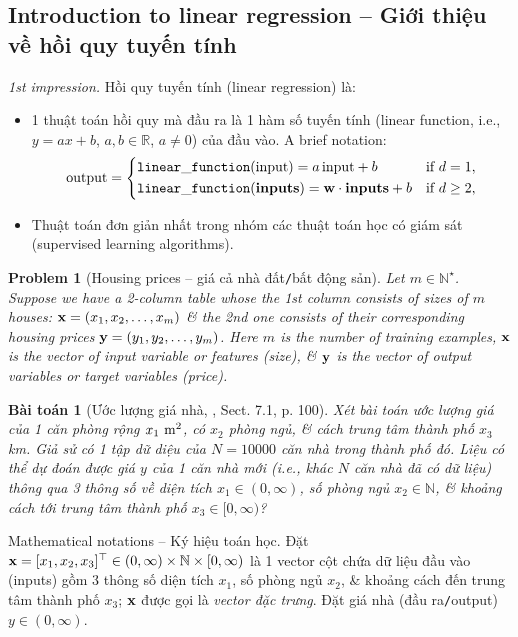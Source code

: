 \documentclass{article}
\newtheorem{baitoan}{Bài toán}
\newtheorem{problem}{Problem}
\begin{document}
\subsection{Introduction to linear regression -- Giới thiệu về hồi quy tuyến tính}
{\it1st impression.} Hồi quy tuyến tính (linear regression) là:
\begin{itemize}
	\item 1 thuật toán hồi quy mà đầu ra là 1 hàm số tuyến tính (linear function, i.e., $y = ax + b$, $a,b\in\mathbb{R}$, $a\ne0$) của đầu vào. A brief notation:
	\begin{equation*}
		{\rm output} = \left\{\begin{split}
			&{\tt linear\_function}({\rm input}) = a\,{\rm input} + b&&\mbox{if } d = 1,\\
			&{\tt linear\_function}({\bf inputs}) = {\bf w}\cdot{\bf inputs} + b&&\mbox{if } d\ge2,\\
		\end{split}\right.
	\end{equation*}
	\item Thuật toán đơn giản nhất trong nhóm các thuật toán học có giám sát (supervised learning algorithms).
\end{itemize}

\begin{problem}[Housing prices -- giá cả nhà đất{\tt/}bất động sản]
	Let $m\in\mathbb{N}^\star$. Suppose we have a 2-column table whose the 1st column consists of sizes of $m$ houses: ${\bf x} = (x_1,x_2,\ldots,x_m)$ \& the 2nd one consists of their corresponding housing prices ${\bf y} = (y_1,y_2,\ldots,y_m)$. Here $m$ is the number of training examples, ${\bf x}$ is the vector of input variable or features (size), \& ${\bf y}$ is the vector of output variables or target variables (price).
\end{problem}

\begin{baitoan}[Ước lượng giá nhà, \cite{Tiep_ML_co_ban}, Sect. 7.1, p. 100]
	Xét bài toán ước lượng giá của 1 căn phòng rộng $x_1\ {\rm m}^2$, có $x_2$ phòng ngủ, \& cách trung tâm thành phố $x_3$ km. Giả sử có 1 tập dữ diệu của $N = 10000$ căn nhà trong thành phố đó. Liệu có thể dự đoán được giá $y$ của 1 căn nhà mới (i.e., khác $N$ căn nhà đã có dữ liệu) thông qua 3 thông số về diện tích $x_1\in(0,\infty)$, số phòng ngủ $x_2\in\mathbb{N}$, \& khoảng cách tới trung tâm thành phố $x_3\in[0,\infty)$?
\end{baitoan}
{\sf Mathematical notations -- Ký hiệu toán học.} Đặt ${\bf x} = [x_1,x_2,x_3]^\top\in(0,\infty)\times\mathbb{N}\times[0,\infty)$ là 1 vector cột chứa dữ liệu đầu vào (inputs) gồm 3 thông số diện tích $x_1$, số phòng ngủ $x_2$, \& khoảng cách đến trung tâm thành phố $x_3$; ${\bf x}$ được gọi là {\it vector đặc trưng}. Đặt giá nhà (đầu ra{\tt/}output) $y\in(0,\infty)$.
\end{document}
